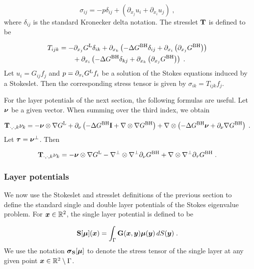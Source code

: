 \begin{equation}
  \sigma_{ij} = -p \delta_{ij} + \left ( \partial_{x_j}u_i
  +\partial_{x_i} u_j \right ) \; , \nonumber
\end{equation}
where $\delta_{ij}$ is the standard Kronecker delta notation.
The stresslet ${\bf T}$ is defined to be

\begin{align}
  T_{ijk} &= - \partial_{x_j} G^{\textrm{L}} \delta_{ik}
  + \partial_{x_k} \left ( -\Delta G^{\textrm{BH}} \delta_{ij} +
  \partial_{x_i} \left(\partial_{x_j} G^{\textrm{BH}} \right) \right)
  \nonumber \\
  & \qquad+ \partial_{x_i} \left ( -\Delta G^{\textrm{BH}} \delta_{kj} +
  \partial_{x_k} \left(\partial_{x_j} G^{\textrm{BH}} \right) \right)
  \; . \label{eq:ostress} \nonumber
\end{align}
Let $u_i = G_{ij} f_j$ and $p = \partial_{x_i} G^{\textrm{L}} f_i$ be a
solution of the Stokes equations induced by a Stokeslet.
Then the corresponding stress tensor is given by
$\sigma_{ik} = T_{ijk} f_j$.

For the layer potentials of the next section, the following
formulas are useful. Let ${\boldsymbol \nu}$ be a given vector. When
summing over the third index, we obtain

\begin{equation}
  {\bf T}_{\cdot,\cdot,k} \nu_k = -{\boldsymbol \nu} \otimes \nabla G^{\textrm{L}}
  + \partial_\nu \left ( -\Delta G^{\textrm{BH}} {\bf I}
  + \nabla \otimes \nabla G^{\textrm{BH}} \right)
  + \nabla \otimes \left ( -\Delta G^{\textrm{BH}} {\boldsymbol \nu}
  + \partial_{\nu} \nabla G^{\textrm{BH}} \right) \; . \nonumber
\end{equation}
Let ${\boldsymbol \tau} = {\boldsymbol \nu}^\bot$. Then

\begin{equation}
  {\bf T}_{\cdot,\cdot,k} \nu_k = -{\boldsymbol \nu} \otimes \nabla G^{\textrm{L}}
  - \nabla^\bot \otimes \nabla^\bot \partial_\nu G^{\textrm{BH}}
  +\nabla \otimes \nabla^\bot \partial_\tau G^{\textrm{BH}} \; .
  \nonumber
\end{equation}

\subsubsection{Layer potentials}

We now use the Stokeslet and stresslet definitions
of the previous section to define the standard single
and double layer potentials of the Stokes eigenvalue
problem. For ${\boldsymbol x} \in \mathbb{R}^2$, the single layer potential
is defined to be

\begin{equation} \label{eq:singlelayer}
  {\bf S} [{\boldsymbol \mu}] ({\boldsymbol x}) = \int_\Gamma {\bf G} ({\boldsymbol x},{\boldsymbol y}) {\boldsymbol \mu}({\boldsymbol y})
  \, dS({\boldsymbol y}) \; .
\end{equation}
We use the notation ${\boldsymbol \sigma}_{\bf S}[{\boldsymbol \mu}]$ to denote the
stress tensor of the single layer at any given point
${\boldsymbol x} \in \mathbb{R}^2 \setminus \Gamma$.

